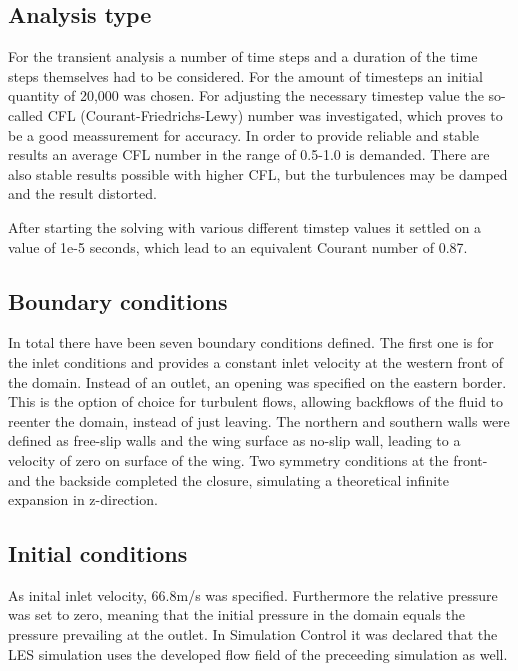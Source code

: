 \subsection{Analysis type}
For the transient analysis a number of time steps and a duration of the time steps themselves had to be considered. For the amount of timesteps an initial quantity of 20,000 was chosen. For adjusting the necessary timestep value the so-called CFL (Courant-Friedrichs-Lewy) number was investigated, which proves to be a good meassurement for accuracy.
In order to provide reliable and stable results an average CFL number in the range of 0.5-1.0 is demanded. There are also stable results possible with higher CFL, but the turbulences may be damped and the result distorted.

After starting the solving with various different timstep values it settled on a value of 1e-5 seconds, which lead to an equivalent Courant number of 0.87.
\subsection{Boundary conditions}
In total there have been seven boundary conditions defined. The first one is for the inlet conditions and provides a constant inlet velocity at the western front of the domain. Instead of an outlet, an opening was specified on the eastern border. This is the option of choice for turbulent flows, allowing backflows of the fluid to reenter the domain, instead of just leaving. The northern and southern walls were defined as free-slip walls and the wing surface as no-slip wall, leading to a velocity of zero on surface of the wing. Two symmetry conditions at the front- and the backside completed the closure, simulating a theoretical infinite expansion in z-direction.
\subsection{Initial conditions}
As inital inlet velocity, 66.8m/s was specified. Furthermore the relative pressure was set to zero, meaning that the initial pressure in the domain equals the pressure prevailing at the outlet.
In Simulation Control it was declared that the LES simulation uses the developed flow field of the preceeding simulation as well.
